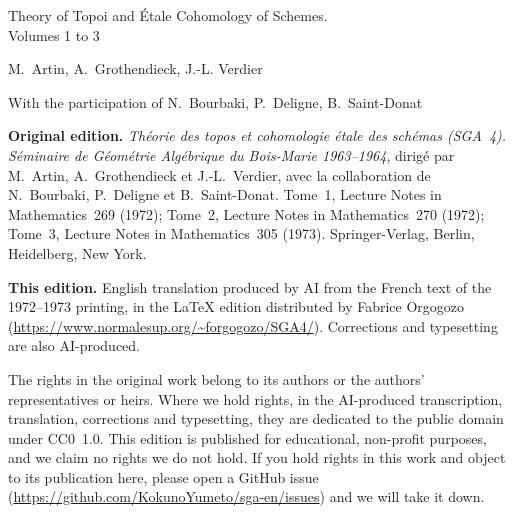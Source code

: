 \documentclass[12pt]{../fichiers-configuration-latex/amsbook}
\providecommand{\SGAArchiveOnly}[1]{}
\begin{document}
\frontmatter
\thispagestyle{empty}
\vspace*{3cm}
\begin{center}
{\Large Theory of Topoi and Étale Cohomology of Schemes.\\
Volumes 1 to 3}\\
\end{center}

\vskip1cm
\begin{center}
M.~Artin, A.~Grothendieck, J.-L. Verdier
\end{center}

\vskip1cm
\begin{center}
With the participation of N.~Bourbaki, P.~Deligne, B.~Saint-Donat
\end{center}

\SGAArchiveOnly{%
\begin{center}
\small Edition: \showgitstatus
\end{center}
}

\clearpage
\thispagestyle{empty}
\null\vfill
\begingroup\small
\noindent\textbf{Original edition.} \textit{Th\'eorie des topos et cohomologie \'etale des sch\'emas (SGA~4). S\'eminaire de G\'eom\'etrie Alg\'ebrique du Bois-Marie 1963--1964}, dirig\'e par M.~Artin, A.~Grothendieck et J.-L.~Verdier, avec la collaboration de N.~Bourbaki, P.~Deligne et B.~Saint-Donat. Tome~1, Lecture Notes in Mathematics~269 (1972); Tome~2, Lecture Notes in Mathematics~270 (1972); Tome~3, Lecture Notes in Mathematics~305 (1973). Springer-Verlag, Berlin, Heidelberg, New York.\par
\medskip
\noindent\textbf{This edition.} English translation produced by AI from the French text of the 1972--1973 printing, in the \LaTeX{} edition distributed by Fabrice Orgogozo (\url{https://www.normalesup.org/~forgogozo/SGA4/}). Corrections and typesetting are also AI-produced.\par
\medskip
\noindent The rights in the original work belong to its authors or the authors' representatives or heirs. Where we hold rights, in the AI-produced transcription, translation, corrections and typesetting, they are dedicated to the public domain under CC0~1.0. This edition is published for educational, non-profit purposes, and we claim no rights we do not hold. If you hold rights in this work and object to its publication here, please open a GitHub issue (\url{https://github.com/KokunoYumeto/sga-en/issues}) and we will take it down.\par
\endgroup
\clearpage
\SGAArchiveOnly{%
\thispagestyle{empty}
\vspace*{\fill}
\begin{center}
\begin{minipage}{0.88\textwidth}
\small
\textbf{Source notice.} This reader is based on the frozen
Orgogozo SGA~4 TeX snapshot at commit \texttt{71766d9}; the frozen source
archive has SHA-256
\texttt{DA2D939D3BD66B03E7BEFF4353550F7A27982847AE4F798D0872F1DB5D64C7DC}.
\end{minipage}
\end{center}
\vspace*{\fill}
\clearpage
}
\tableofcontents
\end{document}
